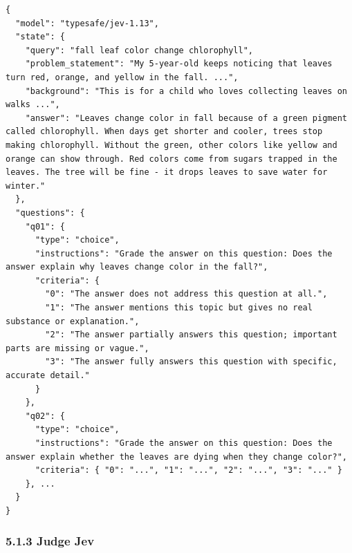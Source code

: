 \documentclass[
  10pt,
]{article}
\begin{document}
\begin{lstlisting}
{
  "model": "typesafe/jev-1.13",
  "state": {
    "query": "fall leaf color change chlorophyll",
    "problem_statement": "My 5-year-old keeps noticing that leaves turn red, orange, and yellow in the fall. ...",
    "background": "This is for a child who loves collecting leaves on walks ...",
    "answer": "Leaves change color in fall because of a green pigment called chlorophyll. When days get shorter and cooler, trees stop making chlorophyll. Without the green, other colors like yellow and orange can show through. Red colors come from sugars trapped in the leaves. The tree will be fine - it drops leaves to save water for winter."
  },
  "questions": {
    "q01": {
      "type": "choice",
      "instructions": "Grade the answer on this question: Does the answer explain why leaves change color in the fall?",
      "criteria": {
        "0": "The answer does not address this question at all.",
        "1": "The answer mentions this topic but gives no real substance or explanation.",
        "2": "The answer partially answers this question; important parts are missing or vague.",
        "3": "The answer fully answers this question with specific, accurate detail."
      }
    },
    "q02": {
      "type": "choice",
      "instructions": "Grade the answer on this question: Does the answer explain whether the leaves are dying when they change color?",
      "criteria": { "0": "...", "1": "...", "2": "...", "3": "..." }
    }, ...
  }
}
\end{lstlisting}

\subsubsection{5.1.3 Judge Jev}\label{judge-jev-1}
\end{document}
